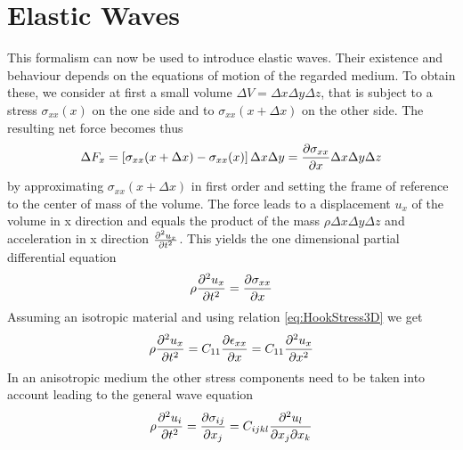 \section{Elastic Waves}
This formalism can now be used to introduce elastic waves. Their existence and
behaviour depends on the equations of motion of the regarded medium. To obtain
these, we consider at first a small volume $\Delta V = \Delta x \Delta y
    \Delta z$, that is subject to a stress $\sigma_{xx}(x)$ on the one side and
to $\sigma_{xx}(x+\Delta x)$ on the other side. The resulting net force becomes
thus
\begin{equation}
    \Delta F_x = \left[ \sigma_{xx}(x+\Delta x)- \sigma_{xx}(x) \right] \Delta
    x \Delta y = \frac{\partial \sigma_{xx}}{\partial x} \Delta x \Delta y \Delta z
\end{equation}
by approximating $\sigma_{xx}(x+\Delta x)$ in first order and setting the frame
of reference to the center of mass of the volume.
The force leads to a displacement $u_x$ of the volume in x direction and equals
the
product of the mass $\rho\Delta x \Delta y \Delta z$ and acceleration in x
direction $\frac{\partial^2 u_x}{\partial t^2}$. This yields the one dimensional partial
differential equation
\begin{equation}
    \rho \frac{\partial^2 u_x}{\partial t^2} = \frac{\partial \sigma_{xx}}{\partial x}
\end{equation}
Assuming an isotropic material and using relation \ref{eq:HookStress3D} we
get
\begin{equation}
    \rho \frac{\partial^2 u_x}{\partial t^2} = C_{11} \frac{\partial \epsilon_{xx}}{\partial x} = C_{11}\frac{\partial^2 u_x}{\partial x^2}
\end{equation}
In an anisotropic medium the other stress components need to be taken into
account leading to the general wave equation
\begin{equation} \label{eq:wave_eq}
    \rho \frac{\partial^2 u_i}{\partial t^2} = \frac{\partial \sigma_{ij}}{\partial x_j} = C_{ijkl}
    \frac{\partial^2 u_l}{\partial x_j \partial x_k}
\end{equation}


